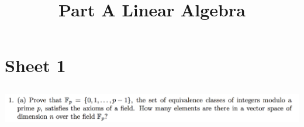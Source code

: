 \documentclass[12pt]{article}
\begin{document}
\title{Part A Linear Algebra}
\maketitle

\section*{Sheet 1}
\subsection*{} %
\includegraphics[width=450pt]{img/linear-algebra-a0-1-1-a.png}\\
\end{document}
